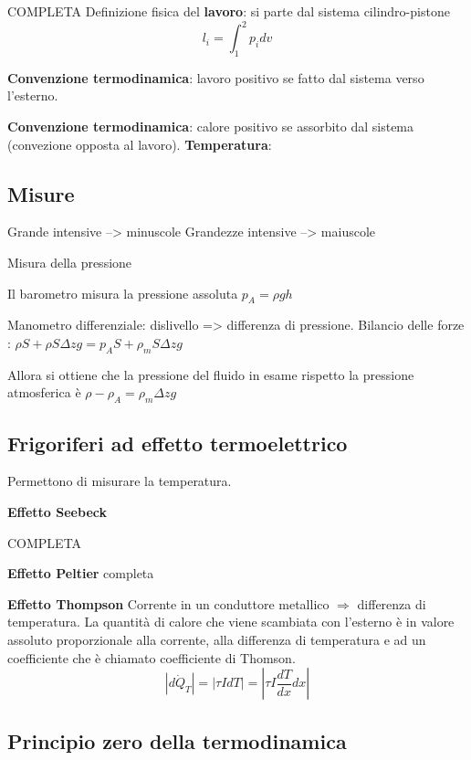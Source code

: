 \documentclass[a4paper]{article}
\numberwithin{equation}{section}%
\newcommand{\myequations}[1]{%
	\addcontentsline{equ}{myequations}{\protect\numberline{\theequation}#1}\par}
\begin{document}
COMPLETA 
Definizione fisica del \textbf{lavoro}: si parte dal sistema cilindro-pistone \begin{equation}
	l_i=\int_1^2 p_idv
\end{equation}
\label{lavoro}
\myequations{Lavoro}

\textbf{Convenzione termodinamica}: lavoro positivo se fatto dal sistema verso l'esterno.

\textbf{Convenzione termodinamica}: calore positivo se assorbito dal sistema (convezione opposta al lavoro).
\textbf{Temperatura}:



\subsection{Misure}

Grande intensive --> minuscole
Grandezze intensive --> maiuscole

Misura della pressione 

Il barometro misura la pressione assoluta $p_A=\rho g h$

Manometro differenziale: dislivello => differenza di pressione. Bilancio delle forze : $ \rho S+\rho S\Delta z g=p_AS+\rho_m S\Delta z g$
 
Allora si ottiene che la pressione del fluido in esame rispetto la pressione atmosferica è $\rho -\rho_A=\rho_m \Delta zg$ 

\subsection{Frigoriferi ad effetto termoelettrico}


Permettono di misurare la temperatura. 

\textbf{Effetto Seebeck}

COMPLETA

\textbf{Effetto Peltier} completa


\textbf{Effetto Thompson} 
Corrente in un conduttore metallico $\Longrightarrow$ differenza di temperatura. La quantità di calore che viene scambiata con l’esterno è in valore
assoluto proporzionale alla corrente, alla differenza di temperatura e ad un coefficiente che è chiamato coefficiente di Thomson.
$$\left|d \dot{Q}_{T}\right|=|\tau I d T|=\left|\tau I \frac{d T}{d x} d x\right|$$ 

\subsection{Principio zero della termodinamica}
\end{document}
